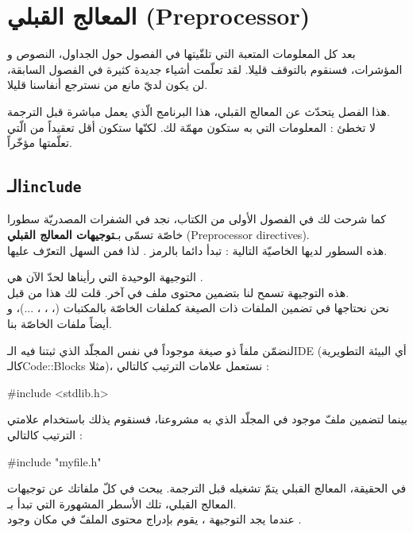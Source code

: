 \chapter{المعالج القبلي (\textenglish{Preprocessor})}

بعد كل المعلومات المتعبة التي تلقّيتها في الفصول حول الجداول، النصوص و المؤشرات، فسنقوم بالتوقف قليلا. لقد تعلّمت أشياء جديدة كثيرة في الفصول السابقة، لن يكون لديّ مانع من نسترجع أنفاسنا قليلا.

هذا الفصل يتحدّث عن المعالج القبلي، هذا البرنامج الّذي يعمل مباشرة قبل الترجمة.\\
لا تخطئ : المعلومات التي به ستكون مهمّة لك. لكنّها ستكون أقل تعقيداً من الّتي تعلّمتها مؤخّراً.

\section{الـ\texttt{include}}

كما شرحت لك  في الفصول الأولى من الكتاب، نجد في الشفرات المصدريّة سطورا خاصّة تسمّى بـ\textbf{توجيهات المعالج القبلي} (\textenglish{Preprocessor directives}).\\
هذه السطور لديها الخاصيّة التالية : تبدأ دائما بالرمز
\InlineCode{\#}.
لذا فمن السهل التعرّف عليها.

التوجيهة الوحيدة التي رأيناها لحدّ الآن هي
.\\
هذه التوجيهة تسمح لنا بتضمين محتوى ملف في آخر. قلت لك هذا من قبل.\\
نحن نحتاجها في تضمين الملفات ذات الصيغة
كملفات
الخاصّة بالمكتبات
(، ، ، ...)،
و أيضاً ملفات
الخاصّة بنا.

لنضمّن ملفاً ذو صيغة
موجوداً في نفس المجلّد الذي ثبتنا فيه الـ\textenglish{IDE}
(أي البيئة التطويرية كالـ\textenglish{Code::Blocks}
مثلا)، نستعمل علامات الترتيب
\InlineCode{< >}
كالتالي :

\begin{Csource}
#include <stdlib.h>
\end{Csource}

بينما لتضمين ملفّ
موجود في المجلّد الذي به مشروعنا، فسنقوم يذلك باستخدام علامتي الترتيب كالتالي :

\begin{Csource}
#include "myfile.h"
\end{Csource}

في الحقيقة، المعالج القبلي يتمّ تشغيله قبل الترجمة. يبحث في كلّ ملفاتك عن توجيهات المعالج القبلي، تلك الأسطر المشهورة التي تبدأ بـ\InlineCode{\#}.\\
عندما يجد التوجيهة
،
يقوم بإدراج محتوى الملفّ في مكان وجود
.


